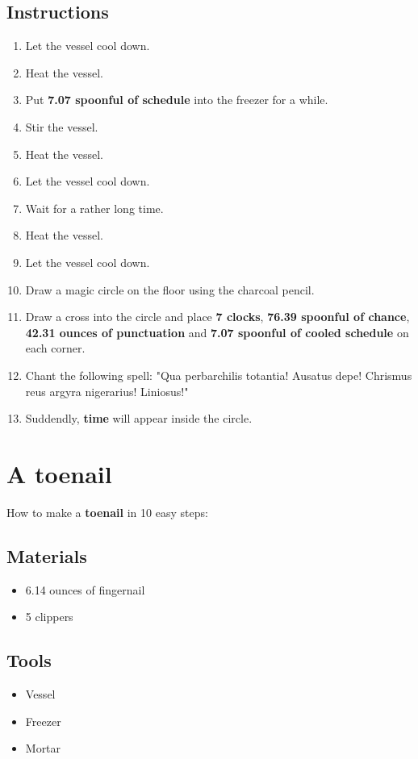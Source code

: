 \documentclass{article}
\begin{document}
\subsection{Instructions}\begin{enumerate}
\item 
Let the vessel cool down.
\item 
Heat the vessel.
\item 
Put \textbf{7.07 spoonful of schedule} into the freezer for a while.
\item 
Stir the vessel.
\item 
Heat the vessel.
\item 
Let the vessel cool down.
\item 
Wait for a rather long time.
\item 
Heat the vessel.
\item 
Let the vessel cool down.
\item 
Draw a magic circle on the floor using the charcoal pencil.
\item 
Draw a cross into the circle and place \textbf{7 clocks}, \textbf{76.39 spoonful of chance}, \textbf{42.31 ounces of punctuation} and \textbf{7.07 spoonful of cooled schedule} on each corner.
\item 
Chant the following spell: "Qua perbarchilis totantia! Ausatus depe! Chrismus reus argyra nigerarius! Liniosus!"
\item 
Suddendly, \textbf{time} will appear inside the circle.
\end{enumerate}
\newpage
\section{A toenail}How to make a \textbf{toenail} in 10 easy steps:

\subsection{Materials}\begin{itemize}
\item 
6.14 ounces of fingernail
\item 
5 clippers
\end{itemize}
\subsection{Tools}\begin{itemize}
\item 
Vessel
\item 
Freezer
\item 
Mortar
\end{itemize}
\end{document}
